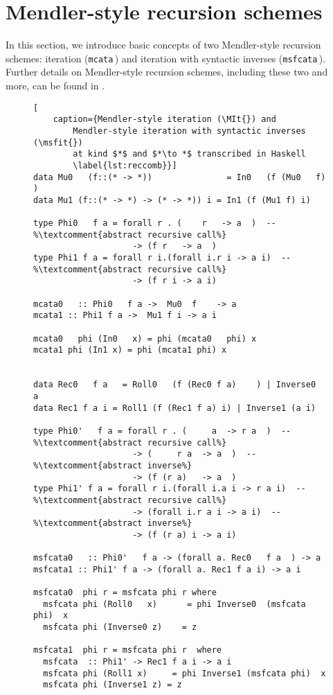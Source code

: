 \section{Mendler-style recursion schemes}
\label{sec:mendler}
In this section, we introduce basic concepts of two Mendler-style recursion
schemes: iteration (\lstinline{mcata}\,) and iteration with syntactic inverses
(\lstinline{msfcata}\,). Further details on Mendler-style recursion schemes,
including these two and more,
can be found in \cite{AhnShe11,AbeMatUus05,UusVen00,AbeMat04}.

\begin{figure}
\begin{lstlisting}[
	caption={Mendler-style iteration (\MIt{}) and
		Mendler-style iteration with syntactic inverses (\msfit{})
		at kind $*$ and $*\to *$ transcribed in Haskell
		\label{lst:reccomb}}]
data Mu0   (f::(* -> *))               = In0   (f (Mu0   f)  )
data Mu1 (f::(* -> *) -> (* -> *)) i = In1 (f (Mu1 f) i)

type Phi0   f a = forall r . (    r   -> a  )  -- %\textcomment{abstract recursive call%}
                    -> (f r   -> a  )
type Phi1 f a = forall r i.(forall i.r i -> a i)  -- %\textcomment{abstract recursive call%}
                    -> (f r i -> a i)

mcata0   :: Phi0   f a ->  Mu0  f    -> a
mcata1 :: Phi1 f a ->  Mu1 f i -> a i

mcata0   phi (In0   x) = phi (mcata0   phi) x
mcata1 phi (In1 x) = phi (mcata1 phi) x


data Rec0   f a   = Roll0   (f (Rec0 f a)    ) | Inverse0   a
data Rec1 f a i = Roll1 (f (Rec1 f a) i) | Inverse1 (a i)

type Phi0'   f a = forall r . (     a  -> r a  )  -- %\textcomment{abstract recursive call%}
                    -> (     r a  -> a  )  -- %\textcomment{abstract inverse%}
                    -> (f (r a)   -> a  )
type Phi1' f a = forall r i.(forall i.a i -> r a i)  -- %\textcomment{abstract recursive call%}
                    -> (forall i.r a i -> a i)  -- %\textcomment{abstract inverse%}
                    -> (f (r a) i -> a i)

msfcata0   :: Phi0'   f a -> (forall a. Rec0   f a  ) -> a
msfcata1 :: Phi1' f a -> (forall a. Rec1 f a i) -> a i

msfcata0  phi r = msfcata phi r where
  msfcata phi (Roll0   x)      = phi Inverse0  (msfcata phi)  x
  msfcata phi (Inverse0 z)    = z

msfcata1  phi r = msfcata phi r  where
  msfcata  :: Phi1' -> Rec1 f a i -> a i
  msfcata phi (Roll1 x)     = phi Inverse1 (msfcata phi)  x
  msfcata phi (Inverse1 z) = z
\end{lstlisting}
\vspace*{-3ex}
\end{figure}

